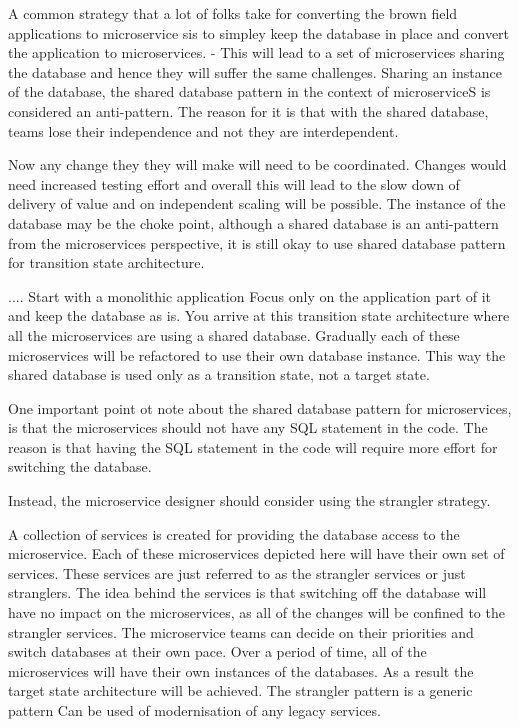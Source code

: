 \documentclass[a4paper, 11pt]{book}
\begin{document}
    A common strategy that a lot of folks take for converting the brown field applications to microservice sis to simpley keep the database in place and convert the application to microservices.
    - This will lead to a set of microservices sharing the database and hence they will suffer the same challenges.
    Sharing an instance of the database, the shared database pattern in the context of microserviceS is considered an anti-pattern.
    The reason for it is that with the shared database, teams lose their independence and not they are interdependent.

    Now any change they they will make will need to be coordinated.
    Changes would need increased testing effort and overall this will lead to the slow down of delivery of value and on independent scaling will be possible.
    The instance of the database may be the choke point, although a shared database is an anti-pattern from the microservices perspective, it is still okay to use shared database pattern for transition state architecture.

    ....
    Start with a monolithic application
    Focus only on the application part of it and keep the database as is.
    You arrive at this transition state architecture where all the microservices are using a shared database.
    Gradually each of these microservices will be refactored to use their own database instance.
    This way the shared database is used only as a transition state, not a target state.

    One important point ot note about the shared database pattern for microservices, is that the microservices should not have any SQL statement in the code.
    The reason is that having the SQL statement in the code will require more effort for switching the database.

    Instead, the microservice designer should consider using the strangler strategy.

    A collection of services is created for providing the database access to the microservice.
    Each of these microservices depicted here will have their own set of services.
    These services are just referred to as the strangler services or just stranglers.
    The idea behind the services is that switching off the database will have no impact on the microservices, as all of the changes will be confined to the strangler services.
    The microservice teams can decide on their priorities and switch databases at their own pace.
    Over a period of time, all of the microservices will have their own instances of the databases.
    As a result the target state architecture will be achieved.
    The strangler pattern is a generic pattern
    Can be used of modernisation of any legacy services.
\end{document}
